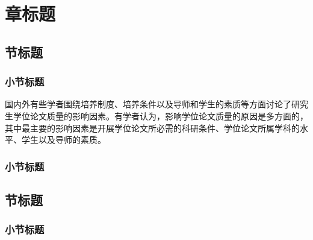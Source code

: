 \chapter{章标题}

\section{节标题}

\subsection{小节标题}

国内外有些学者围绕培养制度、培养条件以及导师和学生的素质等方面讨论了研究生学位论文质量的影响因素。有学者认为，影响学位论文质量的原因是多方面的，其中最主要的影响因素是开展学位论文所必需的科研条件、学位论文所属学科的水平、学生以及导师的素质。

\subsection{小节标题}

\section{节标题}

\subsection{小节标题}
